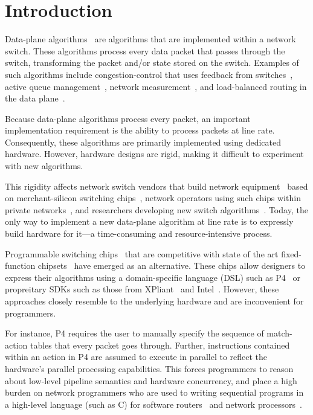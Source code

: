 \section{Introduction}
\label{s:intro}

Data-plane algorithms~\cite{cestan} are algorithms that are implemented within
a network switch. These algorithms process every data packet that passes
through the switch, transforming the packet and/or state stored on the switch.
Examples of such algorithms include congestion-control that uses feedback from
switches~\cite{xcp, rcp, pdq, dctcp}, active queue management~\cite{codel},
network measurement~\cite{opensketch, bitmap_george, elephant_george}, and
load-balanced routing in the data plane~\cite{conga}.

Because data-plane algorithms process every packet, an important implementation
requirement is the ability to process packets at line rate.  Consequently,
these algorithms are primarily implemented using dedicated hardware. However,
hardware designs are rigid, making it difficult to experiment with new
algorithms.

This rigidity affects network switch vendors that build network
equipment~\cite{cisco_nexus, dell_force10, arista_7050} based on
merchant-silicon switching chips~\cite{trident, tomahawk, mellanox}, network
operators using such chips within private networks~\cite{google,facebook,vl2},
and researchers developing new switch algorithms~\cite{xcp, codel, d3, detail,
pdq}. Today, the only way to implement a new data-plane algorithm at line rate
is to expressly build hardware for it---a time-consuming and resource-intensive
process.

Programmable switching chips~\cite{flexpipe, xpliant, rmt} that are competitive
with state of the art fixed-function chipsets~\cite{trident, tomahawk,
mellanox} have emerged as an alternative.  These chips allow designers to
express their algorithms using a domain-specific language (DSL) such as
P4~\cite{p4} or propreitary SDKs such as those from XPliant~\cite{xpliant_sdk,
xpliant_sdk2} and Intel~\cite{intel_sdk}.  However, these approaches closely
resemble to the underlying hardware and are inconvenient for programmers.

For instance, P4 requires the user to manually specify the sequence of
match-action tables that every packet goes through. Further, instructions
contained within an action in P4 are assumed to execute in parallel to reflect
the hardware's parallel processing capabilities. This forces programmers to
reason about low-level pipeline semantics and hardware concurrency, and place a
high burden on network programmers who are used to writing sequential programs
in a high-level language (such as C) for software routers~\cite{click} and
network processors~\cite{ixp4xx, ixp2800}.

